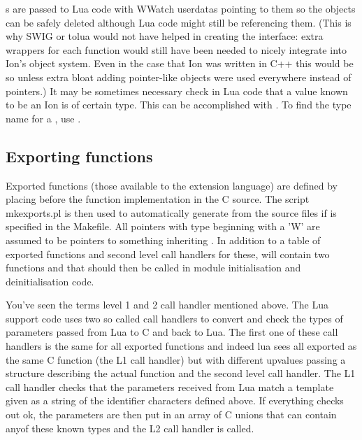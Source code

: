 s are passed to Lua code with WWatch userdatas pointing to
them so the objects can be safely deleted although Lua code might still be
referencing them. (This is why SWIG or tolua would not have helped in
creating the interface: extra wrappers for each function would still
have been needed to nicely integrate into Ion's object system. Even in
the case that Ion was written in C++ this would be so unless extra bloat
adding pointer-like objects were used everywhere instead of pointers.)
It may be sometimes necessary check in Lua code that a value known to
be an Ion  is of certain type. This can be accomplished with
. To find the type name for a ,
use .

\subsection{Exporting functions}
\label{sec:exporting}

Exported functions (those available to the extension language) are
defined by placing  before the function implementation
in the C source. The script mkexports.pl is then used to automatically
generate  from the source files if
is specified in the Makefile. All pointers with type beginning with a 'W'
are assumed to be pointers to something inheriting . In
addition to a table of exported functions and second level call handlers
for these,  will contain two functions
 and
 that should then be called in module
initialisation and deinitialisation code.

You've seen the terms level 1 and 2 call handler mentioned above. 
The Lua support code uses two so called call handlers to convert and check
the types of parameters passed from Lua to C and back to Lua. The first
one of these call handlers is the same for all exported functions and
indeed lua sees all exported as the same C function (the L1 call handler)
but with different upvalues passing a structure describing the actual
function and the second level call handler. The L1 call handler checks
that the parameters received from Lua match a template given as a string
of the identifier characters defined above. If everything checks out ok,
the parameters are then put in an array of C unions that can contain
anyof these known types and the L2 call handler is called.

